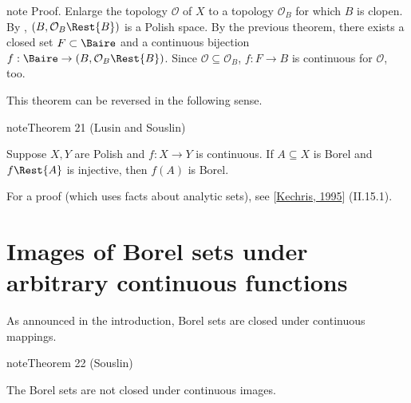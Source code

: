 \documentclass[letterpaper,10pt,english]{jupyterBook}
\begin{document}
\begin{sphinxadmonition}{note}
\sphinxAtStartPar
Proof. Enlarge the topology \(\mathcal{O}\) of \(X\) to a topology \(\mathcal{O}_B\) for which \(B\) is clopen.
By {\hyperref[\detokenize{subsets_Polish:thm-subsets-Polish}]{}}, \((B,\mathcal{O}_B\Rest{B})\) is a Polish space. By the previous theorem, there exists a closed set \(F \subset \Baire\) and a continuous bijection \(f:\Baire \to (B,\mathcal{O}_B\Rest{B})\). Since \(\mathcal{O} \subseteq \mathcal{O}_B\), \(f:F \to B\) is continuous for \(\mathcal{O}\), too.
\end{sphinxadmonition}

\sphinxAtStartPar
This theorem can be reversed in the following sense.
\label{imagesBorel:thm-Borel-injective}
\begin{sphinxadmonition}{note}{Theorem 21 (Lusin and Souslin)}



\sphinxAtStartPar
Suppose \(X,Y\) are Polish and \(f:X \to Y\) is continuous. If \(A \subseteq X\) is Borel and \(f\Rest{A}\) is injective, then \(f(A)\) is Borel.
\end{sphinxadmonition}

\sphinxAtStartPar
For a proof (which uses facts about analytic sets), see {[}\hyperlink{cite.bibliography:id10}{Kechris, 1995}{]} (II.15.1).


\section{Images of Borel sets under arbitrary continuous functions}
\label{\detokenize{imagesBorel:images-of-borel-sets-under-arbitrary-continuous-functions}}
\sphinxAtStartPar
As announced in the introduction, Borel sets are  closed under  continuous mappings.
\label{imagesBorel:thm-Souslin-Borel-images}
\begin{sphinxadmonition}{note}{Theorem 22 (Souslin)}



\sphinxAtStartPar
The Borel sets are not closed under continuous images.
\end{sphinxadmonition}
\end{document}
